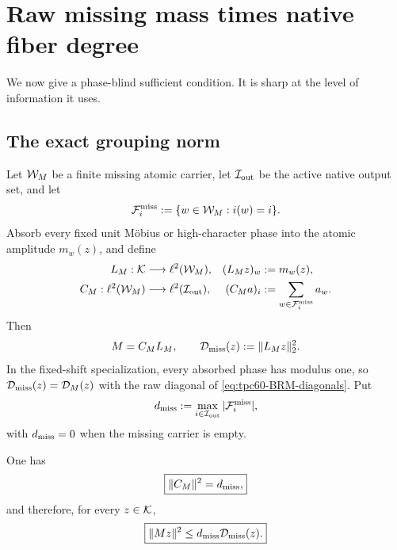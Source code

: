 \section{Raw missing mass times native fiber degree}
\label{sec:tpc60-mass-degree}

We now give a phase-blind sufficient condition.  It is sharp at the level
of information it uses.

\subsection{The exact grouping norm}

Let \(\mathcal W_M\) be a finite missing atomic carrier, let \(\mathcal I_{\rm out}\) be
the active native output set, and let
\begin{equation}
 \mathcal F_i^{\rm miss}
 :=\{w\in\mathcal W_M:i(w)=i\}.
 \label{eq:tpc60-missing-native-fibers}
\end{equation}
Absorb every fixed unit M\"obius or high-character phase into the atomic
amplitude \(m_w(z)\), and define
\begin{align}
 L_M:\mathcal K&\longrightarrow\ell^2(\mathcal W_M),
 &(L_Mz)_w&:=m_w(z),
 \label{eq:tpc60-missing-atomic-lift}\\
 C_M:\ell^2(\mathcal W_M)&\longrightarrow\ell^2(\mathcal I_{\rm out}),
 &(C_Ma)_i&:=\sum_{w\in\mathcal F_i^{\rm miss}}a_w.
 \label{eq:tpc60-missing-grouping}
\end{align}
Then
\begin{equation}
 M=C_ML_M,
 \qquad
 \mathcal D_{\rm miss}(z):=\|L_Mz\|_2^2.
 \label{eq:tpc60-M-factorization-Dmiss}
\end{equation}
In the fixed-shift specialization, every absorbed phase has modulus one,
so \(\mathcal D_{\rm miss}(z)=\mathcal D_M(z)\) with the raw diagonal of
\eqref{eq:tpc60-BRM-diagonals}.
Put
\begin{equation}
 d_{\rm miss}:=\max_{i\in\mathcal I_{\rm out}}
                   |\mathcal F_i^{\rm miss}|,
 \label{eq:tpc60-native-missing-degree}
\end{equation}
with \(d_{\rm miss}=0\) when the missing carrier is empty.

\begin{proposition}
\label{prop:tpc60-exact-grouping-norm}
One has
\begin{equation}
 \boxed{
 \|C_M\|^2=d_{\rm miss},}
 \label{eq:tpc60-CM-norm}
\end{equation}
and therefore, for every \(z\in\mathcal K\),
\begin{equation}
 \boxed{
 \|Mz\|^2\le d_{\rm miss}\mathcal D_{\rm miss}(z).}
 \label{eq:tpc60-mass-degree-upper}
\end{equation}
\end{proposition}

